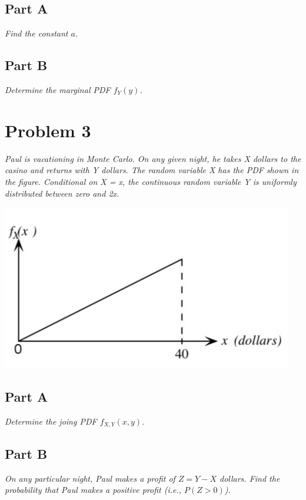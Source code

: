 \documentclass{article}
\begin{document}
\subsection*{Part A}

\textit{Find the constant $ a $.}

\subsection*{Part B}

\textit{Determine the marginal PDF $ f_Y(y) $.}

\section*{Problem 3}

\textit{Paul is vacationing in Monte Carlo. On any given night, he takes X
dollars to the casino and returns with Y dollars. The random variable X has
the PDF shown in the figure. Conditional on X = x, the continuous random
variable Y is uniformly distributed between zero and 2x.}

\begin{center}
    \includegraphics[scale=1]{Images/P3.PNG}
\end{center}

\subsection*{Part A}

\textit{Determine the joing PDF $ f_{X,Y}(x, y) $.}

\subsection*{Part B}

\textit{On any particular night, Paul makes a profit of $ Z = Y - X $ dollars.
Find the probability that Paul makes a positive profit (i.e., $ P(Z > 0)$). }
\end{document}
